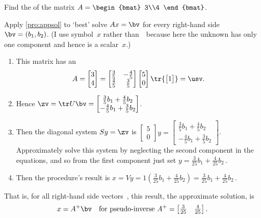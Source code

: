 \begin{example} \label{eg:psinv34}
Find the  of the matrix \(A=\begin{bmat} 3\\4 \end{bmat}\).
\begin{solution} 
Apply \cref{pro:appsol} to `best' solve \(Ax=\bv\) for every right-hand side~\(\bv=(b_1,b_2)\).
(I use symbol~\(x\) rather than~\xv\ because here the unknown has only one component and hence is a scalar~\(x\).)
\begin{enumerate}
\item This matrix has an \svd\ 
\begin{equation*}
A=\begin{bmatrix} 3\\4 \end{bmatrix}
=\begin{bmatrix} \frac35&-\frac45\\\frac45&\frac35 \end{bmatrix}
\begin{bmatrix} 5\\0 \end{bmatrix}\tr{\begin{bmatrix} 1 \end{bmatrix}}
=\usv.
\end{equation*}

\item Hence \(\zv=\tr U\bv=\begin{bmatrix} \tfrac35b_1+\tfrac45b_2\\-\tfrac45b_1+\tfrac35b_2 \end{bmatrix}\).
\item Then the diagonal system \(Sy=\zv\) is \(\begin{bmatrix} 5\\0 \end{bmatrix}y=\begin{bmatrix} \tfrac35b_1+\tfrac45b_2\\-\tfrac45b_1+\tfrac35b_2 \end{bmatrix}\). 
Approximately solve this system by neglecting the second component in the equations, and so from the first component just set \(y=\tfrac3{25}b_1+\tfrac4{25}b_2\)\,.
\item Then the procedure's result is \(x=Vy=1(\tfrac3{25}b_1+\tfrac4{25}b_2)=\tfrac3{25}b_1+\tfrac4{25}b_2\)\,.
\end{enumerate}
That is, for all right-hand side vectors~\bv, this result, the  approximate solution, is
\begin{equation*}
x=A^+\bv\quad\text{for pseudo-inverse }A^+=\begin{bmatrix} \tfrac3{25}& \tfrac4{25} \end{bmatrix}.
\end{equation*}
\end{solution}
\end{example}



